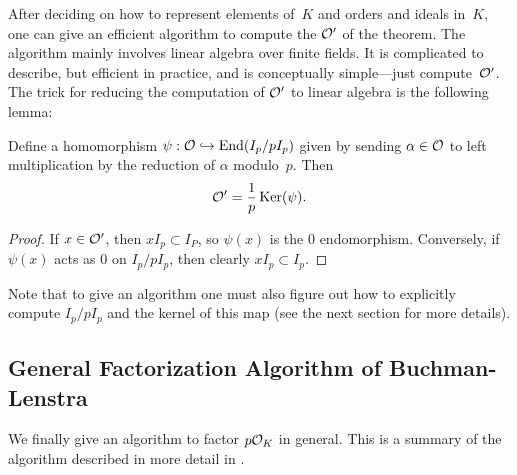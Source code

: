 After deciding on how to represent elements of~$K$ and orders and
ideals in~$K$, one can give an efficient algorithm to compute the
$\mathcal{O}'$ of the theorem.  The algorithm mainly involves linear algebra
over finite fields.  It is complicated to describe, but efficient in
practice, and is conceptually simple---just compute~$\mathcal{O}'$.  The trick
for reducing the computation of $\mathcal{O}'$ to linear algebra is the
following lemma:
\begin{lemma}
  Define a homomorphism $\psi:\mathcal{O} \hookrightarrow \operatorname{End}(I_p/ p I_p)$ given by
  sending $\alpha\in\mathcal{O}$ to left multiplication by the reduction of
  $\alpha$ modulo~$p$.  Then
$$
   \mathcal{O}'=\frac{1}{p} \operatorname{Ker}(\psi).
$$
\end{lemma}
\begin{proof}
If $x \in \mathcal{O}'$, then $x I_p \subset I_P$, so $\psi(x)$ is the $0$
endomorphism.  Conversely, if $\psi(x)$ acts as $0$ on $I_p/ p I_p$,
then clearly $x I_p \subset I_p$.
\end{proof}

Note that to give an algorithm one must also figure out how to
explicitly compute $I_p/ p I_p$ and the kernel of this map
(see  the next section for more
details).


\subsection{General Factorization Algorithm of Buchman-Lenstra}
We finally give an algorithm to factor $p\mathcal{O}_K$ in general. This is a
summary of the algorithm described in more detail in
\cite[\S6.2]{cohen:course_ant}.


